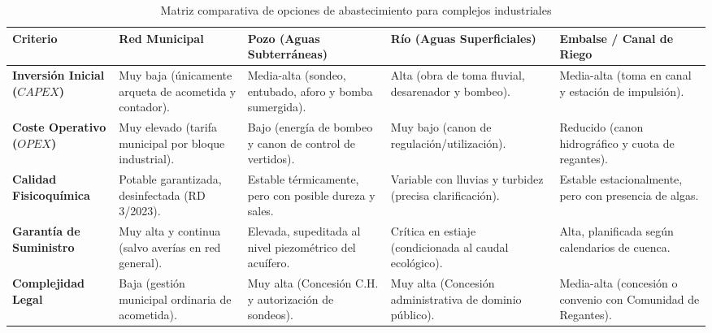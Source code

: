 \documentclass{report}
\begin{document}
\begin{table}[H]

    \centering

    \small

    \caption{Matriz comparativa de opciones de abastecimiento para complejos industriales}

    \label{tab:comparativa_fuentes}

    \begin{tabularx}{\textwidth}{@{}lXXXX@{}}

        \toprule

        \textbf{Criterio} & \textbf{Red Municipal} & \textbf{Pozo (Aguas Subterráneas)} & \textbf{Río (Aguas Superficiales)} & \textbf{Embalse / Canal de Riego} \\

        \midrule

        \textbf{Inversión Inicial ($CAPEX$)} & Muy baja (únicamente arqueta de acometida y contador). & Media-alta (sondeo, entubado, aforo y bomba sumergida). & Alta (obra de toma fluvial, desarenador y bombeo). & Media-alta (toma en canal y estación de impulsión). \\

        \addlinespace

        \textbf{Coste Operativo ($OPEX$)} & Muy elevado (tarifa municipal por bloque industrial). & Bajo (energía de bombeo y canon de control de vertidos). & Muy bajo (canon de regulación/utilización). & Reducido (canon hidrográfico y cuota de regantes). \\

        \addlinespace

        \textbf{Calidad Fisicoquímica} & Potable garantizada, desinfectada (RD 3/2023). & Estable térmicamente, pero con posible dureza y sales. & Variable con lluvias y turbidez (precisa clarificación). & Estable estacionalmente, pero con presencia de algas. \\

        \addlinespace

        \textbf{Garantía de Suministro} & Muy alta y continua (salvo averías en red general). & Elevada, supeditada al nivel piezométrico del acuífero. & Crítica en estiaje (condicionada al caudal ecológico). & Alta, planificada según calendarios de cuenca. \\

        \addlinespace

        \textbf{Complejidad Legal} & Baja (gestión municipal ordinaria de acometida). & Muy alta (Concesión C.H. y autorización de sondeos). & Muy alta (Concesión administrativa de dominio público). & Media-alta (concesión o convenio con Comunidad de Regantes). \\

        \bottomrule

    \end{tabularx}

\end{table}
\end{document}
